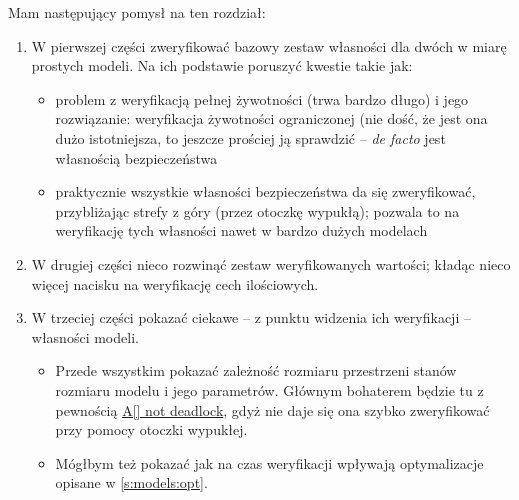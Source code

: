 \documentclass{pracamgr}
\theoremstyle{plain}
\begin{document}
Mam następujący pomysł na ten rozdział:
\begin{enumerate}
  \item W pierwszej części zweryfikować bazowy zestaw własności dla
  dwóch w miarę prostych modeli. Na ich podstawie poruszyć kwestie
  takie jak:
  \begin{itemize}
    \item problem z weryfikacją pełnej żywotności (trwa bardzo długo)
    i jego rozwiązanie: weryfikacja żywotności ograniczonej (nie dość,
    że jest ona dużo istotniejsza, to jeszcze prościej ją sprawdzić --
    \emph{de facto} jest własnością bezpieczeństwa
    \item praktycznie wszystkie własności bezpieczeństwa da się
    zweryfikować, przybliżając strefy z góry (przez otoczkę wypukłą);
    pozwala to na weryfikację tych własności nawet w bardzo dużych
    modelach
  \end{itemize}
  \item W drugiej części nieco rozwinąć zestaw weryfikowanych
  wartości; kładąc nieco więcej nacisku na weryfikację cech
  ilościowych.
  \item W trzeciej części pokazać ciekawe -- z punktu widzenia ich
  weryfikacji -- własności modeli.
  \begin{itemize}
    \item Przede wszystkim pokazać zależność rozmiaru przestrzeni
    stanów rozmiaru modelu i jego parametrów. Głównym bohaterem będzie
    tu z pewnością \url{A[] not deadlock}, gdyż nie daje się ona
    szybko zweryfikować przy pomocy otoczki wypukłej.
    \item Mógłbym też pokazać jak na czas weryfikacji wpływają
    optymalizacje opisane w \ref{s:models:opt}.
  \end{itemize}
\end{enumerate}

\end{document}
